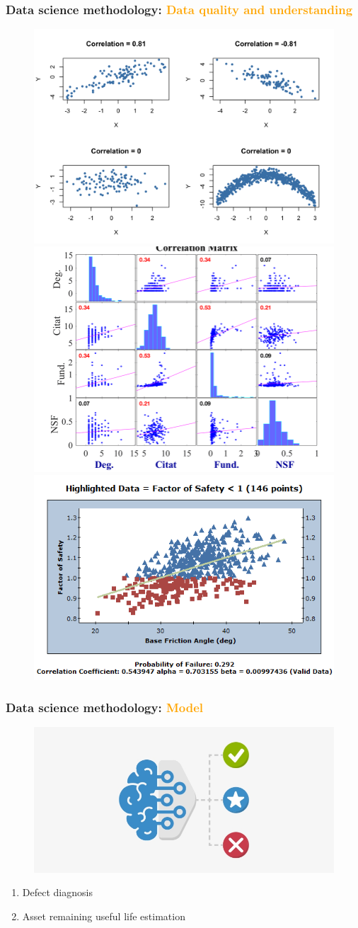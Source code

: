 \documentclass{beamer}
\begin{document}
\begin{frame}
	\frametitle{Data science methodology: \textcolor{orange}{Data quality and understanding}}
\begin{figure}[H]
	\centering
	\includegraphics[width=0.4\linewidth]{data1}
	\includegraphics[width=0.4\linewidth]{data2}
	\includegraphics[width=0.4\linewidth]{data3}
\end{figure}
\end{frame}
\begin{frame}
	\frametitle{Data science methodology: \textcolor{orange}{Model}}
\begin{figure}[H]
	\centering
	\includegraphics[width=0.9\linewidth]{model1}
\end{figure}
\begin{enumerate}
	\item Defect diagnosis
	\item Asset remaining useful life estimation
\end{enumerate}
\end{frame}
\end{document}
